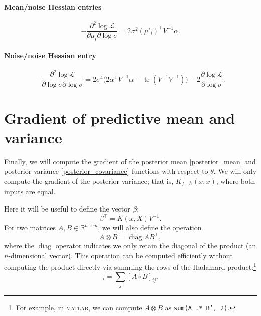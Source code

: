 \documentclass{article}
\newcommand{\given}{\mid}
\newcommand{\cm}[1]{\mathcal{#1}}
\newcommand{\data}{\cm{D}}
\newcommand{\R}{\mathbb{R}}
\newcommand{\LL}{\cm{L}}
\newcommand{\trans}{^{\top}}
\newcommand{\inv}{^{-1}}
\DeclareMathOperator{\tr}{tr}
\DeclareMathOperator{\diag}{diag}
\begin{document}
\paragraph{Mean/noise Hessian entries}

\begin{equation*}
  -\frac{\partial^2 \log \LL}{\partial \mu_i \partial \log \sigma}
  =
  2\sigma^2(\mu'_i)\trans V\inv \alpha.
\end{equation*}

\paragraph{Noise/noise Hessian entry}

\begin{equation*}
  -\frac{\partial^2 \log \LL}{\partial \log \sigma \partial \log \sigma}
  =
  2 \sigma^4\bigl(2 \alpha\trans V\inv \alpha - \tr(V\inv V\inv)\bigr) - 2\frac{\partial \log \LL}{\partial \log \sigma}.
\end{equation*}

\section{Gradient of predictive mean and variance}

Finally, we will compute the gradient of the posterior mean
\eqref{posterior_mean} and posterior variance
\eqref{posterior_covariance} functions with respect to $\theta$.  We
will only compute the gradient of the posterior variance; that is,
$K_{f \given \data}(x, x)$, where both inputs are equal.

Here it will be useful to define the vector $\beta$:
\begin{equation*}
  \beta\trans
  =
  K(x, X)V\inv.
\end{equation*}
For two matrices $A, B \in \R^{n \times m}$, we will also define the
operation
\begin{equation*}
  A \otimes B
  =
  \diag AB\trans,
\end{equation*}
where the $\diag$ operator indicates we only retain the diagonal of
the product (an $n$-dimensional vector).  This operation can be
computed efficiently without computing the product directly via
summing the rows of the Hadamard product:\footnote{For example, in
  \textsc{matlab}, we can compute $A \otimes B$ as
  \texttt{sum(A .* B', 2)}.}
\begin{equation*}
  [A \otimes B]_{i}
  =
  \sum_j [A \circ B]_{ij}.
\end{equation*}
\end{document}
